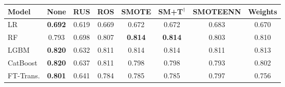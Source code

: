 \begin{tabular}{l c c c c c c c}
\toprule
Model & None & RUS & ROS & SMOTE & SM+T$^{\dagger}$ & SMOTEENN & Weights \\
\midrule
LR         & \textbf{0.692} & 0.619 & 0.669 & 0.672 & 0.672 & 0.683 & 0.670 \\
RF         & 0.793 & 0.698 & 0.807 & \textbf{0.814} & \textbf{0.814} & 0.803 & 0.810 \\
LGBM       & \textbf{0.820} & 0.632 & 0.811 & 0.814 & 0.814 & 0.811 & 0.813 \\
CatBoost   & \textbf{0.820} & 0.637 & 0.811 & 0.798 & 0.798 & 0.793 & 0.802 \\
FT-Trans.  & \textbf{0.801} & 0.641 & 0.784 & 0.785 & 0.785 & 0.797 & 0.756 \\
\bottomrule
\end{tabular}
